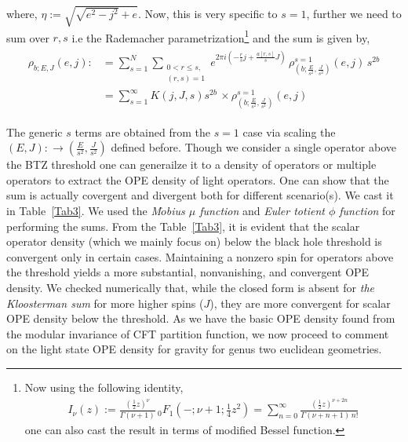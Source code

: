 \documentclass[12 pt]{article}
\begin{document}
where, $\eta:= \sqrt{\sqrt{e^2-j^2}+e}$.
Now, this is very specific to $s=1$, further we need to sum over $r,s$ i.e the Rademacher parametrization\footnote{Now using the following identity,
\begin{align}
I_\nu(z) := \frac{( \tfrac{1}{2} z)^{\nu}}{\Gamma(\nu + 1)} \, {}_0F_1\left(-;\nu + 1; \tfrac{1}{4} z^2\right) 
= \sum_{n=0}^{\infty} \frac{(\tfrac{1}{2} z)^{\nu + 2n}}{\Gamma(\nu + n + 1) \, n!}
\end{align} one can also cast the result in terms of modified Bessel function.} and the sum is given by,
\begin{align}
\begin{split}
\rho_{b;E,J}(e,j):&=\sum_{s=1}^{N}\sum_{\substack{ 0 < r \le s,\\[1pt] (r,s)=1 }}
e^{2\pi i\left(-\frac{r}{s} j + \frac{a{[r,s]}}{s} J\right)} \, \rho^{s=1}_{(b;\frac{E}{s^2},\frac{J}{s^2})}(e,j)\,s^{2b}\\&
=\sum_{s=1}^\infty K(j,J,s)s^{2b} \,\times\rho^{s=1}_{(b;\frac{E}{s^2},\frac{J}{s^2})}(e,j)\label{eq:grav-rademacher-sum}
\end{split}
\end{align}


\noindent
The generic $s$ terms are obtained from the $s=1$ case via scaling the $(E,J):\to(\frac{E}{s^2},\frac{J}{s^2})$ defined before. Though we consider a single operator above the BTZ threshold one can generailze it to a density of operators or multiple operators to extract the OPE density of light operators. One can show that the sum is actually covergent and divergent both for different scenario(s). We cast it in Table~\eqref{Tab3}.
\noindent
We used the \textit{ M$\ddot{o}$bius $\mu$ function} and \textit{Euler totient $\phi$ function} for performing the sums.
From the Table~\eqref{Tab3}, it is evident that the scalar operator density (which we mainly focus on) below the black hole threshold is convergent only in certain cases. Maintaining a nonzero spin for operators above the threshold yields a more substantial, nonvanishing, and convergent OPE density. We checked numerically that, while the closed form is absent for \textit{the Kloosterman sum} for more higher spins ($J$), they are more convergent for scalar OPE density below the threshold. As we have the basic OPE density found from the modular invariance of CFT partition function, we now proceed to comment on the light state OPE density for gravity for genus two euclidean geometries.
\end{document}
